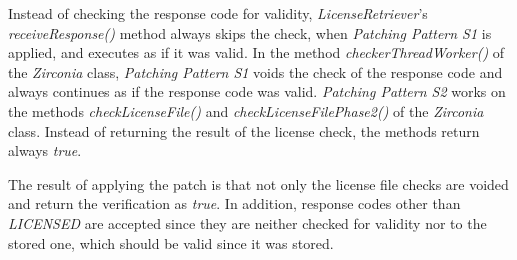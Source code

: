Instead of checking the response code for validity, \textit{LicenseRetriever}'s \textit{receiveResponse()} method always skips the check, when \textit{Patching Pattern S1} is applied, and executes as if it was valid.
In the method \textit{checkerThreadWorker()} of the \textit{Zirconia} class, \textit{Patching Pattern S1} voids the check of the response code and always continues as if the response code was valid.
\newline
\textit{Patching Pattern S2} works on the methods \textit{checkLicenseFile()} and \textit{checkLicenseFilePhase2()} of the \textit{Zirconia} class.
Instead of returning the result of the license check, the methods return always \textit{true}.
\newline

The result of applying the patch is that not only the license file checks are voided and return the verification as \textit{true}.
In addition, response codes other than \textit{LICENSED} are accepted since they are neither checked for validity nor to the stored one, which should be valid since it was stored.
